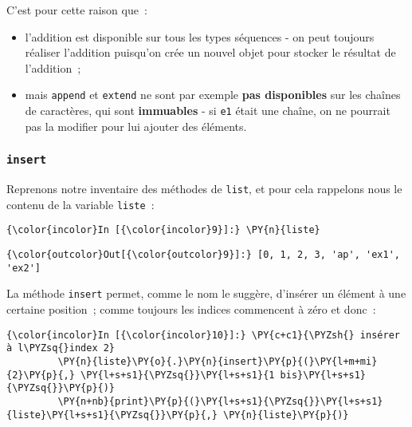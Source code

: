     C'est pour cette raison que~:

\begin{itemize}
\tightlist
\item
  l'addition est disponible sur tous les types séquences - on peut
  toujours réaliser l'addition puisqu'on crée un nouvel objet pour
  stocker le résultat de l'addition~;
\item
  mais \texttt{append} et \texttt{extend} ne sont par exemple
  \textbf{pas disponibles} sur les chaînes de caractères, qui sont
  \textbf{immuables} - si \texttt{e1} était une chaîne, on ne pourrait
  pas la modifier pour lui ajouter des éléments.
\end{itemize}

    \hypertarget{insert}{%
\subsubsection{\texorpdfstring{\texttt{insert}}{insert}}\label{insert}}

    Reprenons notre inventaire des méthodes de \texttt{list}, et pour cela
rappelons nous le contenu de la variable \texttt{liste}~:

    \begin{Verbatim}[commandchars=\\\{\},frame=single,framerule=0.3mm,rulecolor=\color{cellframecolor}]
{\color{incolor}In [{\color{incolor}9}]:} \PY{n}{liste}
\end{Verbatim}


\begin{Verbatim}[commandchars=\\\{\},frame=single,framerule=0.3mm,rulecolor=\color{cellframecolor}]
{\color{outcolor}Out[{\color{outcolor}9}]:} [0, 1, 2, 3, 'ap', 'ex1', 'ex2']
\end{Verbatim}
            
    La méthode \texttt{insert} permet, comme le nom le suggère, d'insérer un
élément à une certaine position~; comme toujours les indices commencent
à zéro et donc~:

    \begin{Verbatim}[commandchars=\\\{\},frame=single,framerule=0.3mm,rulecolor=\color{cellframecolor}]
{\color{incolor}In [{\color{incolor}10}]:} \PY{c+c1}{\PYZsh{} insérer à l\PYZsq{}index 2}
         \PY{n}{liste}\PY{o}{.}\PY{n}{insert}\PY{p}{(}\PY{l+m+mi}{2}\PY{p}{,} \PY{l+s+s1}{\PYZsq{}}\PY{l+s+s1}{1 bis}\PY{l+s+s1}{\PYZsq{}}\PY{p}{)}
         \PY{n+nb}{print}\PY{p}{(}\PY{l+s+s1}{\PYZsq{}}\PY{l+s+s1}{liste}\PY{l+s+s1}{\PYZsq{}}\PY{p}{,} \PY{n}{liste}\PY{p}{)}
\end{Verbatim}


